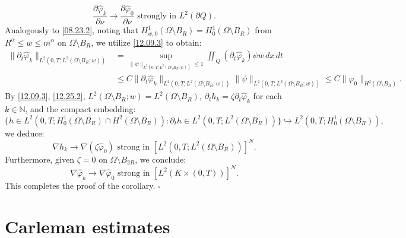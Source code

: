 \documentclass[11pt]{article}
\newenvironment{proof}{{\bf {Proof.}}}{\hfill $\square$}
\numberwithin{equation}{section}
\def\bf{\textbf}
\def\Om{\Omega}
\def\se{\setminus}
\def\hra{\hookrightarrow}
\begin{document}
\begin{proof}
\begin{equation*}
\frac{\partial \widehat{\varphi}_k}{\partial \nu} \to \frac{\partial \widehat{\varphi}_0}{\partial \nu}   \text{ strongly in } L^2(\partial Q).
\end{equation*}
Analogously to \eqref{08.23.2}, noting that $H_{w,0}^1(\Omega \setminus B_R) = H_0^1(\Omega \setminus B_R)$ from $R^\alpha \leq w \leq m^\alpha$ on $\Omega \setminus B_R$, we utilize \eqref{12.09.3} to obtain:
\begin{equation*}
\begin{split}
\|\partial_t \widehat{\varphi}_k\|_{L^2(0,T; L^2(\Omega \setminus B_R; w))}
&= \sup_{\|\psi\|_{L^2(0,T; L^2(\Omega \setminus B_R; w))} \leq 1} \iint_Q (\partial_t \widehat{\varphi}_k) \psi w \, dx \, dt \\
&\leq C \|\partial_t \widehat{\varphi}_k\|_{L^2(0,T; L^2(\Omega \setminus B_R; w))} \|\psi\|_{L^2(0,T; L^2(\Omega \setminus B_R; w))} \leq C \|\varphi_0\|_{H^2(\Omega \setminus B_R)}.
\end{split}
\end{equation*}
By \eqref{12.09.3}, \eqref{12.25.2}, $L^2(\Om\se B_R;w)=L^2(\Om\se B_R)$, $\partial_t h_k = \zeta \partial_t \widehat{\varphi}_k$ for each $k \in \mathbb{N}$, and the compact embedding:
\begin{equation*}
\{h \in L^2(0,T; H_0^1(\Omega \setminus B_R) \cap H^2(\Omega \setminus B_R))\colon \partial_t h \in L^2(0,T; L^2(\Omega \setminus B_R))\} \hra L^2(0,T; H_0^1(\Omega \setminus B_R)),
\end{equation*}
we deduce:
\begin{equation*}
\nabla h_k \to \nabla (\zeta \widehat{\varphi}_0)   \text{ strong in } [L^2(0,T; L^2(\Omega \setminus B_R))]^N.
\end{equation*}
Furthermore, given $\zeta = 0$ on $\Omega \setminus B_{2R}$, we conclude:
\begin{equation*}
\nabla \widehat{\varphi}_k \to \nabla \widehat{\varphi}_0   \text{ strong in } [L^2(K \times (0,T))]^N.
\end{equation*}
This completes the proof of the corollary.
\end{proof}

\section{Carleman estimates}\label{Section 4}
\end{document}
